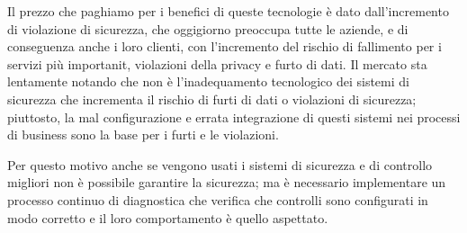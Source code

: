 Il prezzo che paghiamo per i benefici di queste tecnologie è dato dall'incremento di 
violazione di sicurezza, che oggigiorno preoccupa tutte le aziende, e di conseguenza anche i 
loro clienti, con l'incremento del rischio di fallimento per i servizi più importanit, 
violazioni della privacy e furto di dati.
\newline
Il mercato sta lentamente notando che non è l'inadequamento tecnologico dei sistemi di sicurezza
che incrementa il rischio di furti di dati o violazioni di sicurezza; piuttosto, la mal configurazione
e errata integrazione di questi sistemi nei processi di business sono la base per 
i furti e le violazioni. \cite{cloud-Platform-for-ICT-Security-Governance}

Per questo motivo anche se vengono usati i sistemi di sicurezza e di controllo migliori non è possibile 
garantire la sicurezza; ma è necessario implementare un processo continuo di diagnostica che verifica che 
controlli sono configurati in modo corretto e il loro comportamento è quello aspettato.

